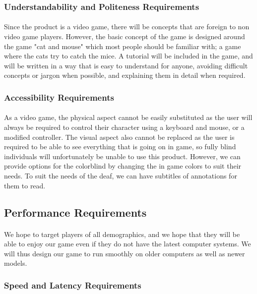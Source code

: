 \documentclass[12pt, titlepage]{article}
\begin{document}
\subsubsection{Understandability and Politeness Requirements}
\paragraph{}Since the product is a video game, there will be concepts that are foreign to non video game players. However, the basic concept of the game is designed around the game "cat and mouse" which most people should be familiar with; a game where the cats try to catch the mice. A tutorial will be included in the game, and will be written in a way that is easy to understand for anyone, avoiding difficult concepts or jargon when possible, and explaining them in detail when required. 
\subsubsection{Accessibility Requirements}
\paragraph{}As a video game, the physical aspect cannot be easily substituted as the user will always be required to control their character using a keyboard and mouse, or a modified controller. The visual aspect also cannot be replaced as the user is required to be able to see everything that is going on in game, so fully blind individuals will unfortunately be unable to use this product. However, we can provide options for the colorblind by changing the in game colors to suit their needs. To suit the needs of the deaf, we can have subtitles of annotations for them to read. 
\subsection{Performance Requirements}
\paragraph{}We hope to target players of all demographics, and we hope that they will be able to enjoy our game even if they do not have the latest computer systems. We will thus design our game to run smoothly on older computers as well as newer models.
\subsubsection{Speed and Latency Requirements}
\end{document}
